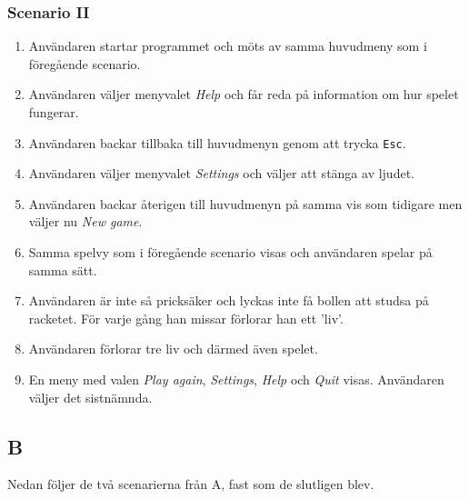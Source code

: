 \documentclass[11pt,a4paper]{article}
\begin{document}
\subsubsection{Scenario II}
\begin{enumerate}
	\item Användaren startar programmet och möts av samma huvudmeny som i föregående scenario.
	\item Användaren väljer menyvalet \emph{Help} och får reda på information om hur spelet fungerar.
	\item Användaren backar tillbaka till huvudmenyn genom att trycka \texttt{Esc}.
	\item Användaren väljer menyvalet \emph{Settings} och väljer att stänga av ljudet.
	\item Användaren backar återigen till huvudmenyn på samma vis som tidigare men väljer nu \emph{New game}.
	\item Samma spelvy som i föregående scenario visas och användaren spelar på samma sätt.
	\item Användaren är inte så pricksäker och lyckas inte få bollen att studsa på racketet. För varje gång han missar förlorar han ett 'liv'.
	\item Användaren förlorar tre liv och därmed även spelet.
	\item En meny med valen \emph{Play again}, \emph{Settings}, \emph{Help} och \emph{Quit} visas. Användaren väljer det sistnämnda.
\end{enumerate}

\subsection{B}
Nedan följer de två scenarierna från A, fast som de slutligen blev.
\end{document}

